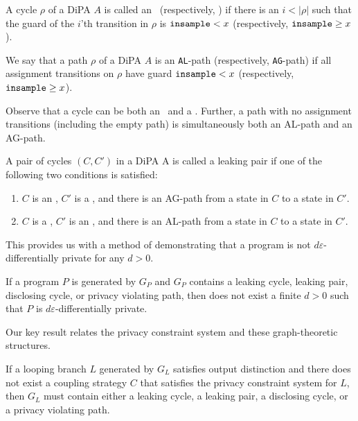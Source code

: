 \begin{defn}
    A cycle $\rho$ of a DiPA $A$ is called an \lcycle~(respectively, \gcycle) if there is an $i< |\rho|$ such that the guard of the $i$'th transition in $\rho$ is $\texttt{insample} < x$ (respectively, $\texttt{insample}\geq x$).

    We say that a path $\rho$ of a DiPA $A$ is an \texttt{AL}-path (respectively, \texttt{AG}-path) if all assignment transitions on $\rho$ have guard $\texttt{insample} < x$ (respectively, $\texttt{insample}\geq x$).

    Observe that a cycle can be both an \lcycle~and a \gcycle.
    Further, a path with no assignment transitions (including the empty path) is simultaneously both an AL-path and an AG-path.
\end{defn} 
\begin{defn}\label{defLeakingPairs}
    A pair of cycles $(C, C')$ in a DiPA A is called a leaking pair if one of the following two conditions is satisfied:
    \begin{enumerate}
        \item $C$ is an \lcycle, $C'$ is a \gcycle, and there is an AG-path
        from a state in $C$ to a state in $C'$.
        \item $C$ is a \gcycle, $C'$ is an \lcycle, and there is an AL-path
        from a state in $C$ to a state in $C'$.
    \end{enumerate}
\end{defn} 



This provides us with a method of demonstrating that a program is not $d\varepsilon$-differentially private for any $d>0$.


\begin{cor}
    If a program $P$ is generated by $G_P$ and $G_P$ contains a leaking cycle, leaking pair, disclosing cycle, or privacy violating path, then does not exist a finite $d>0$ such that $P$ is $d\varepsilon$-differentially private. 
\end{cor}

Our key result relates the privacy constraint system and these graph-theoretic structures.

\begin{lemma}
    If a looping branch $L$ generated by $G_L$ satisfies output distinction and there does not exist a coupling strategy $C$ that satisfies the privacy constraint system for $L$, then $G_L$ must contain either a leaking cycle, a leaking pair, a disclosing cycle, or a privacy violating path. 
\end{lemma}